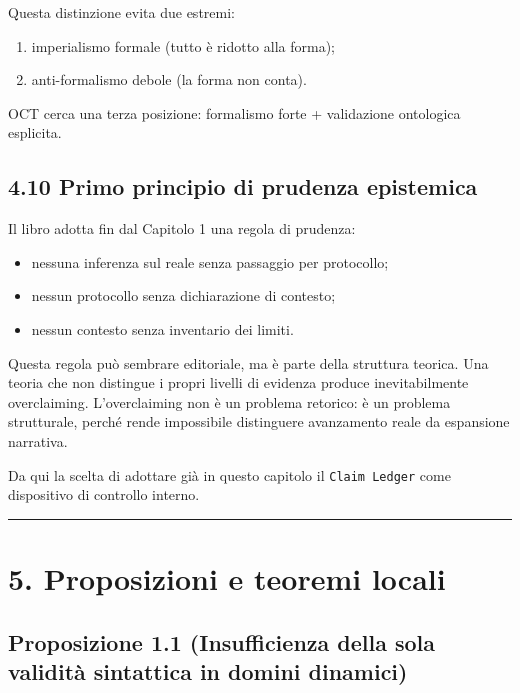 Questa distinzione evita due estremi:

\begin{enumerate}
\def\labelenumi{\arabic{enumi}.}
\tightlist
\item
  imperialismo formale (tutto è ridotto alla forma);
\item
  anti-formalismo debole (la forma non conta).
\end{enumerate}

OCT cerca una terza posizione: formalismo forte + validazione ontologica esplicita.

\subsection{4.10 Primo principio di prudenza epistemica}

Il libro adotta fin dal Capitolo 1 una regola di prudenza:

\begin{itemize}
\tightlist
\item
  nessuna inferenza sul reale senza passaggio per protocollo;
\item
  nessun protocollo senza dichiarazione di contesto;
\item
  nessun contesto senza inventario dei limiti.
\end{itemize}

Questa regola può sembrare editoriale, ma è parte della struttura teorica. Una teoria che non distingue i propri livelli di evidenza produce inevitabilmente overclaiming. L'overclaiming non è un problema retorico: è un problema strutturale, perché rende impossibile distinguere avanzamento reale da espansione narrativa.

Da qui la scelta di adottare già in questo capitolo il \texttt{Claim\ Ledger} come dispositivo di controllo interno.

\begin{center}\rule{0.5\linewidth}{0.5pt}\end{center}

\section{5. Proposizioni e teoremi locali}

\subsection{Proposizione 1.1 (Insufficienza della sola validità sintattica in domini dinamici)}

